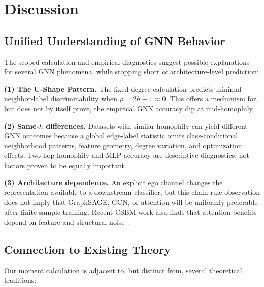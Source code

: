 
\section{Discussion}
\label{sec:discussion}

\subsection{Unified Understanding of GNN Behavior}

The scoped calculation and empirical diagnostics suggest possible explanations for several GNN phenomena, while stopping short of architecture-level prediction:

\textbf{(1) The U-Shape Pattern.} The fixed-degree calculation predicts minimal neighbor-label discriminability when $\rho = 2h-1 \approx 0$. This offers a mechanism for, but does not by itself prove, the empirical GNN accuracy dip at mid-homophily.

\textbf{(2) Same-$h$ differences.} Datasets with similar homophily can yield different GNN outcomes because a global edge-label statistic omits class-conditional neighborhood patterns, feature geometry, degree variation, and optimization effects. Two-hop homophily and MLP accuracy are descriptive diagnostics, not factors proven to be equally important.

\textbf{(3) Architecture dependence.} An explicit ego channel changes the representation available to a downstream classifier, but this chain-rule observation does not imply that GraphSAGE, GCN, or attention will be uniformly preferable after finite-sample training. Recent CSBM work also finds that attention benefits depend on feature and structural noise~\cite{pmlr-v267-ma25w}.

\subsection{Connection to Existing Theory}

Our moment calculation is adjacent to, but distinct from, several theoretical traditions:

